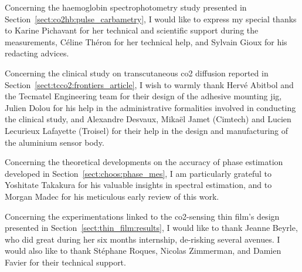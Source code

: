 Concerning the haemoglobin spectrophotometry study presented in Section~\ref{sect:co2hb:pulse_carbametry}, I would like to express my special thanks to Karine Pichavant for her technical and scientific support during the measurements, Céline Théron for her technical help, and Sylvain Gioux for his redacting advices.

Concerning the clinical study on transcutaneous \gls{co2} diffusion reported in Section~\ref{sect:tcco2:frontiers_article}, I wish to warmly thank Hervé Abitbol and the Tecmatel Engineering team for their design of the adhesive mounting jig, Julien Dolou for his help in the administrative formalities involved in conducting the clinical study, and Alexandre Desvaux, Mikaël Jamet (Cimtech) and Lucien Lecurieux Lafayette (Troisel) for their help in the design and manufacturing of the aluminium sensor body.

Concerning the theoretical developments on the accuracy of phase estimation developed in Section~\ref{sect:choos:phase_mes}, I am particularly grateful to Yoshitate Takakura for his valuable insights in spectral estimation, and to Morgan Madec for his meticulous early review of this work.

Concerning the experimentations linked to the \gls{co2}-sensing thin film's design presented in Section~\ref{sect:thin_film:results}, I would like to thank Jeanne Beyrle, who did great during her six months internship, de-risking several avenues. I would also like to thank Stéphane Roques, Nicolas Zimmerman, and Damien Favier for their technical support.